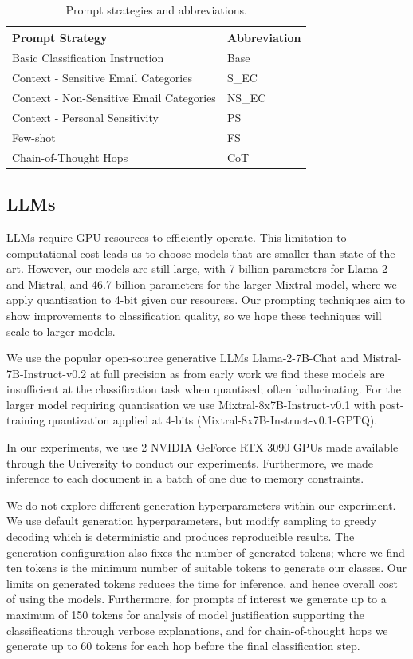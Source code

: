 \begin{table}[!h]
\caption{Prompt strategies and abbreviations.}
\label{table:prompt_abbrev}
\begin{tabular}{ll}
\hline
Prompt Strategy                          & Abbreviation \\ \hline
Basic Classification Instruction                      & Base         \\
Context - Sensitive Email Categories     & S\_EC      \\
Context - Non-Sensitive Email Categories & NS\_EC   \\
Context - Personal Sensitivity             & PS     \\
Few-shot                                 & FS           \\
Chain-of-Thought Hops                    & CoT          \\ \hline
\end{tabular}
\end{table}

\subsection{LLMs}
\label{sec:experiment:LLMs}
LLMs require GPU resources to efficiently operate. This limitation to computational cost leads us to choose models that are smaller than state-of-the-art. However, our models are still large, with 7 billion parameters for Llama 2 and Mistral, and 46.7 billion parameters for the larger Mixtral model, where we apply quantisation \cite{frantar2022gptq} to 4-bit given our resources. Our prompting techniques aim to show improvements to classification quality, so we hope these techniques will scale to larger models.

We use the popular open-source generative LLMs Llama-2-7B-Chat and Mistral-7B-Instruct-v0.2 at full precision as from early work we find these models are insufficient at the classification task when quantised; often hallucinating. For the larger model requiring quantisation we use Mixtral-8x7B-Instruct-v0.1 with post-training quantization \cite{frantar2022gptq} applied at 4-bits (Mixtral-8x7B-Instruct-v0.1-GPTQ).

In our experiments, we use 2 NVIDIA GeForce RTX 3090 GPUs made available through the University to conduct our experiments. Furthermore, we made inference to each document in a batch of one due to memory constraints.

We do not explore different generation hyperparameters within our experiment. We use default generation hyperparameters, but modify sampling to greedy decoding which is deterministic and produces reproducible results. The generation configuration also fixes the number of generated tokens; where we find ten tokens is the minimum number of suitable tokens to generate our classes. Our limits on generated tokens reduces the time for inference, and hence overall cost of using the models. Furthermore, for prompts of interest we generate up to a maximum of 150 tokens for analysis of model justification supporting the classifications through verbose explanations, and for chain-of-thought hops we generate up to 60 tokens for each hop before the final classification step.

